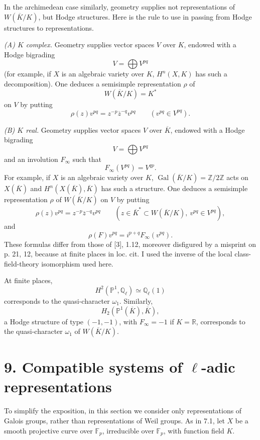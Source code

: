 \documentclass[10pt]{article}
\newcommand{\Q}{\mathbb Q}
\newcommand{\Z}{\mathbb Z}
\newcommand{\F}{\mathbb F}
\newcommand{\Gal}{\operatorname{Gal}}
\providecommand{\R}{\mathbb R}
\providecommand{\Gal}{\operatorname{Gal}}
\providecommand{\Gal}{\operatorname{Gal}}
\providecommand{\Gal}{\operatorname{Gal}}
\providecommand{\Gal}{\operatorname{Gal}}
\begin{document}
In the archimedean case similarly, geometry supplies not representations of $W(\overline K/K)$, but Hodge structures. Here is the rule to use in passing from Hodge structures to representations.

\emph{(A) $K$ complex.} Geometry supplies vector spaces $V$ over $K$, endowed with a Hodge bigrading
\[
V=\bigoplus V^{pq}
\]
(for example, if $X$ is an algebraic variety over $K$, $H^n(X,K)$ has such a decomposition). One deduces a semisimple representation $\rho$ of
\[
W(\overline K/K)=K^*
\]
on $V$ by putting
\[
\rho(z)v^{pq}=z^{-p}\overline z^{-q}v^{pq}\qquad(v^{pq}\in V^{pq}).
\]

\emph{(B) $K$ real.} Geometry supplies vector spaces $V$ over $\overline K$, endowed with a Hodge bigrading
\[
V=\bigoplus V^{pq}
\]
and an involution $F_\infty$ such that
\[
F_\infty(V^{pq})=V^{qp}.
\]
For example, if $X$ is an algebraic variety over $K$, $\Gal(\overline K/K)=\Z/2\Z$ acts on $X(\overline K)$ and $H^n(X(\overline K),\overline K)$ has such a structure. One deduces a semisimple representation $\rho$ of $W(\overline K/K)$ on $V$ by putting
\[
\rho(z)v^{pq}=z^{-p}\overline z^{-q}v^{pq}\qquad(z\in\overline K^*\subset W(\overline K/K),\ v^{pq}\in V^{pq}),
\]
and
\[
\rho(F)v^{pq}=i^{p+q}F_\infty(v^{pq}).
\]
These formulas differ from those of [3], 1.12, moreover disfigured by a misprint on p. 21, 12, because at finite places in loc. cit. I used the inverse of the local class-field-theory isomorphism used here.

At finite places,
\[
H^2(\mathbb P^1,\Q_\ell)\simeq\Q_\ell(1)
\]
corresponds to the quasi-character $\omega_1$. Similarly,
\[
H_2(\mathbb P^1(\overline K),\overline K),
\]
a Hodge structure of type $(-1,-1)$, with $F_\infty=-1$ if $K=\R$, corresponds to the quasi-character $\omega_1$ of $W(\overline K/K)$.

\section*{9. Compatible systems of $\ell$-adic representations}

To simplify the exposition, in this section we consider only representations of Galois groups, rather than representations of Weil groups. As in 7.1, let $X$ be a smooth projective curve over $\F_p$, irreducible over $\F_p$, with function field $K$.
\end{document}
